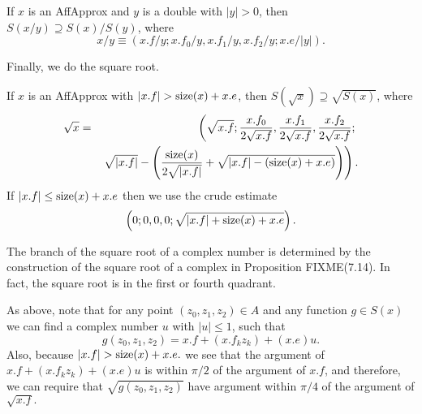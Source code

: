  If $x$ is an {\rm AffApprox}  and $y$ is a double
with $|y| > 0${\rm ,} then $S(x / y) \supseteq S(x) / S(y)${\rm ,} where
$$
x / y \equiv (x.f / y; x.f_0 / y, 
x.f_1 / y, x.f_2 / y; 
x.e/ |y| ).
$$
\endproclaim

Finally, we do the square root.

 If $x$ is an {\rm AffApprox}  with $|x.f| > {\rm size}(x) + x.e${\rm ,}
 then $S(\sqrt x)
\supseteq
\sqrt {S(x)}${\rm ,} where
\begin{eqnarray*}
\sqrt x& = &\left(\sqrt {x.f}; 
 {x.f_0 \over 2 \sqrt {x.f}}, 
 {x.f_1 \over 2 \sqrt {x.f}}, 
 {x.f_2 \over 2 \sqrt {x.f}};
\right.\\
&& \left. \sqrt {|x.f|} - \left({{\rm size}(x) \over 2 \sqrt {|x.f|}} + \sqrt {|x.f| - ({\rm size}(x) + x.e)}\right)
                                              \right).
\end{eqnarray*}
\endproclaim 
If $|x.f| \le {\rm size}(x) + x.e$ then we use the crude estimate $$\left(0;0,0,0;\sqrt{|x.f| + {\rm size}(x) + x.e}\right).$$
 
The branch of the square root of a complex number is determined by the construction of the square root of a complex in Proposition FIXME(7.14).  In fact, the square root is in the first or fourth quadrant.

As above, note that for any point $(z_0, z_1, z_2) \in A$ and any function $g \in S(x)$ we can find a complex number $u$ with 
$|u|   \le 1$, such that
$$ g(z_0, z_1, z_2) = x.f + (x.f_k z_k) + (x.e) u.$$
Also, because $|x.f| > {\rm size}(x) + x.e.$ we see that the argument of
$x.f + (x.f_k z_k) + (x.e) u$ is within $\pi/2$ of the argument of 
$x.f$, and therefore, we can require that $\sqrt{g(z_0,z_1,z_2)}$ have argument within $\pi/4$ of the argument of $\sqrt{x.f}.$

